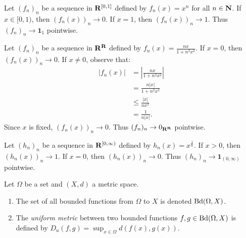 \documentclass[12pt,twoside,openany]{memoir}
\begin{document}
    \begin{example}
        Let $(f_n)_n$ be a sequence in $\mathbf{R}^{[0,1]}$ defined by $f_n(x) = x^n$ for all $n \in \mathbf{N}$. If $x \in [0,1)$, then $(f_n(x))_n \rightarrow 0$. If $x = 1$, then $(f_n(x))_n \rightarrow 1$. Thus $(f_n)_n \rightarrow \mathbf{1}_{1}$ pointwise.
    \end{example}

    \begin{example}
        Let $(f_n)_n$ be a sequence in $\mathbf{R}^{\mathbf{R}}$ defined by $f_n(x) = \frac{nx}{1 + n^2x^2}$. If $x = 0$, then $(f_n(x))_n \rightarrow 0$. If $x \neq 0$, observe that:
            \begin{equation*}
            \begin{split}
                |f_n(x)|
                & = \left| \frac{nx}{1 + n^2 x^2} \right| \\
                & = \frac{n |x|}{1 + n^2 x^2} \\ 
                & \leq \frac{|x|}{nx^2} \\
                & = \frac{1}{n|x|}.
            \end{split}
            \end{equation*}
        Since $x$ is fixed, $(f_n(x))_n \rightarrow 0$. Thus $(f_n)_n \rightarrow 0_{\mathbf{R}^{\mathbf{R}}}$ pointwise.
    \end{example}

    \begin{example}
        Let $(h_n)_n$ be a sequence in $\mathbf{R}^{[0,\infty)}$ defined by $h_n(x) = x^{\frac{1}{n}}$. If $x > 0$, then $(h_n(x))_n \rightarrow 1$. If $x = 0$, then $(h_n(x))_n \rightarrow 0$. Thus $(h_n)_n \rightarrow \mathbf{1}_{(0,\infty)}$ pointwise.
    \end{example}

    \begin{definition}
        Let $\Omega$ be a set and $(X,d)$ a metric space.
        \begin{enumerate}[label = (\arabic*),itemsep=1pt,topsep=3pt]
            \item The set of all bounded functions from $\Omega$ to $X$ is denoted $\operatorname{Bd}(\Omega,X)$.
            \item The \textit{uniform metric} between two bounded functions $f,g \in \operatorname{Bd}(\Omega,X)$ is defined by $D_u(f,g) = \sup_{x \in \Omega}d(f(x),g(x))$.
        \end{enumerate}
    \end{definition}
\end{document}
